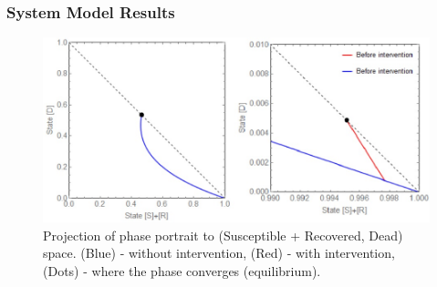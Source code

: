 \documentclass[30pt]{beamer}
\begin{document}
\begin{frame}
\frametitle{System Model Results}
\begin{figure}[!h]
  \centering
  \includegraphics[width=1\textwidth]{PhasePortrait}
  \caption{ Projection of phase portrait to (Susceptible + Recovered, Dead) space. (Blue) - without intervention,
(Red) - with intervention, (Dots) - where the phase converges (equilibrium).}

\end{figure}
\end{frame}
\end{document}
